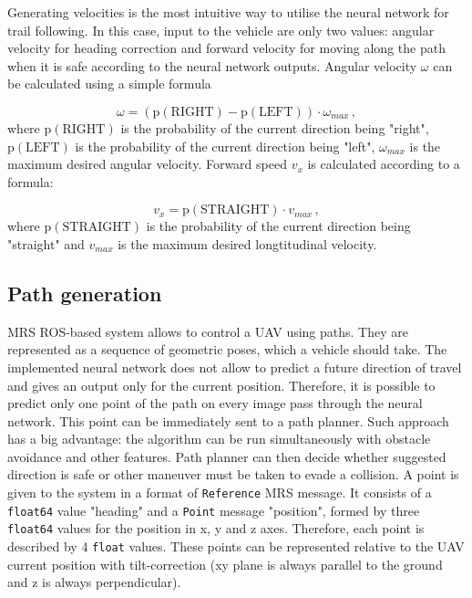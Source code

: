 Generating velocities is the most intuitive way to utilise the neural network for trail following. In this case, input to the vehicle are only two values: angular velocity for heading correction and forward velocity for moving along the path when it is safe according to the neural network outputs. Angular velocity $\omega$ can be calculated using a simple formula

\begin{equation}
	\omega = (\textrm{p}(\textrm{RIGHT}) - \textrm{p}(\textrm{LEFT}))\cdot\omega_{max}\,,
\end{equation}
where $\textrm{p}(\textrm{RIGHT})$ is the probability of the current direction being "right", $\textrm{p}(\textrm{LEFT})$ is the probability of the current direction being "left", $\omega_{max}$ is the maximum desired angular velocity. Forward speed $v_x$ is calculated according to a formula:

\begin{equation}
	v_x = \textrm{p}(\textrm{STRAIGHT})\cdot v_{max}\,,
\end{equation}
where $\textrm{p}(\textrm{STRAIGHT})$ is the probability of the current direction being "straight" and $v_{max}$ is the maximum desired longtitudinal velocity.


\subsection{Path generation}

\acs{MRS} \acs{ROS}-based system allows to control a \acs{UAV} using paths. They are represented as a sequence of geometric poses, which a vehicle should take. The implemented neural network does not allow to predict a future direction of travel and gives an output only for the current position. Therefore, it is possible to predict only one point of the path on every image pass through the neural network. This point can be immediately sent to a path planner. Such approach has a big advantage: the algorithm can be run simultaneously with obstacle avoidance and other features. Path planner can then decide whether suggested direction is safe or other maneuver must be taken to evade a collision. A point is given to the system in a format of \texttt{Reference} \acs{MRS} message. It consists of a \texttt{float64} value "heading" and a \texttt{Point} message "position", formed by three \texttt{float64} values for the position in x, y and z axes. Therefore, each point is described by 4 \texttt{float} values. These points can be represented relative to the \acs{UAV} current position with tilt-correction (xy plane is always parallel to the ground and z is always perpendicular). 

